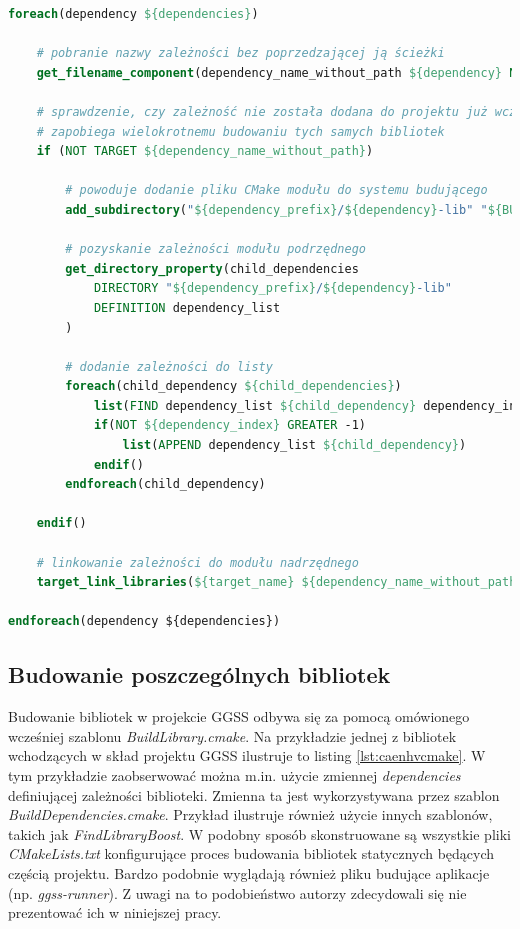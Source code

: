 \begin{lstlisting}[language=cmake, caption={Plik \textit{BuildDependencies.cmake} będący częścią systemu budującego projekt GGSS. Zawiera pętlę iterującą po zależnościach aktualnie budowanego modułu. Zależności te dodawane są do systemu budującego za pomocą polecenia \textit{add\_subdirectory}. Dołączone do listingu komentarze stanowią wytłumaczenie działania poszczególnych elementów pliku.}, label={lst:builddependenciescmake}]
foreach(dependency ${dependencies})
    
    # pobranie nazwy zależności bez poprzedzającej ją ścieżki
    get_filename_component(dependency_name_without_path ${dependency} NAME)

    # sprawdzenie, czy zależność nie została dodana do projektu już wcześniej - 
    # zapobiega wielokrotnemu budowaniu tych samych bibliotek
    if (NOT TARGET ${dependency_name_without_path})

        # powoduje dodanie pliku CMake modułu do systemu budującego
        add_subdirectory("${dependency_prefix}/${dependency}-lib" "${BUILD_OUTPUT_DIRECTORY}/${dependency_name_without_path}-lib/build")

        # pozyskanie zależności modułu podrzędnego 
        get_directory_property(child_dependencies 
            DIRECTORY "${dependency_prefix}/${dependency}-lib" 
            DEFINITION dependency_list
        )

        # dodanie zależności do listy 
        foreach(child_dependency ${child_dependencies})
            list(FIND dependency_list ${child_dependency} dependency_index)
            if(NOT ${dependency_index} GREATER -1)
                list(APPEND dependency_list ${child_dependency})
            endif()
        endforeach(child_dependency)
        
    endif()

    # linkowanie zależności do modułu nadrzędnego
    target_link_libraries(${target_name} ${dependency_name_without_path})

endforeach(dependency ${dependencies})
\end{lstlisting}


\subsection{Budowanie poszczególnych bibliotek}
Budowanie bibliotek w projekcie GGSS odbywa się za pomocą omówionego wcześniej szablonu \textit{BuildLibrary.cmake}. Na przykładzie jednej z bibliotek wchodzących w skład projektu GGSS ilustruje to listing \ref{lst:caenhvcmake}. W tym przykładzie zaobserwować można m.in. użycie zmiennej \textit{dependencies} definiującej zależności biblioteki. Zmienna ta jest wykorzystywana przez szablon \textit{BuildDependencies.cmake}. Przykład ilustruje również użycie innych szablonów, takich jak \textit{FindLibraryBoost}. W podobny sposób skonstruowane są wszystkie pliki \textit{CMakeLists.txt} konfigurujące proces budowania bibliotek statycznych będących częścią projektu. Bardzo podobnie wyglądają również pliku budujące aplikacje (np. \textit{ggss-runner}). Z uwagi na to podobieństwo autorzy zdecydowali się nie prezentować ich w niniejszej pracy. 

